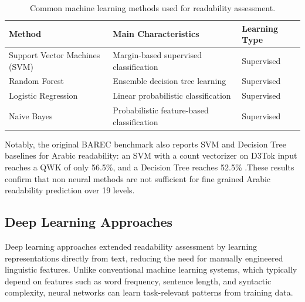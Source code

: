 \documentclass[12pt]{report}
\begin{document}
\begin{table}[H]

\centering

\caption{Common machine learning methods used for readability assessment.}  


\label{tab:ml_readability}
\vspace{3mm}
\begin{tabular}{p{4cm} p{7cm} p{2.5cm}}

\toprule

\textbf{Method} & \textbf{Main Characteristics} & \textbf{Learning Type} \\

\midrule

Support Vector Machines (SVM) & Margin-based supervised classification & Supervised \\

Random Forest & Ensemble decision tree learning & Supervised \\

Logistic Regression & Linear probabilistic classification & Supervised \\

Naive Bayes & Probabilistic feature-based classification & Supervised \\

\bottomrule

\end{tabular}

\end{table}
Notably, the original BAREC benchmark also reports SVM and Decision Tree baselines for Arabic readability: an SVM with a count vectorizer on D3Tok input reaches a QWK of only 56.5\%, and a Decision Tree reaches 52.5\% \cite{elmadani2025barec}.These results confirm that non neural methods are not sufficient for fine grained Arabic readability prediction over 19 levels.





\subsection{Deep Learning Approaches}




Deep learning approaches extended readability assessment by learning representations directly from text, reducing the need for manually engineered linguistic features. Unlike conventional machine learning systems, which typically depend on features such as word frequency, sentence length, and syntactic complexity, neural networks can learn task-relevant patterns from training data.
\end{document}
